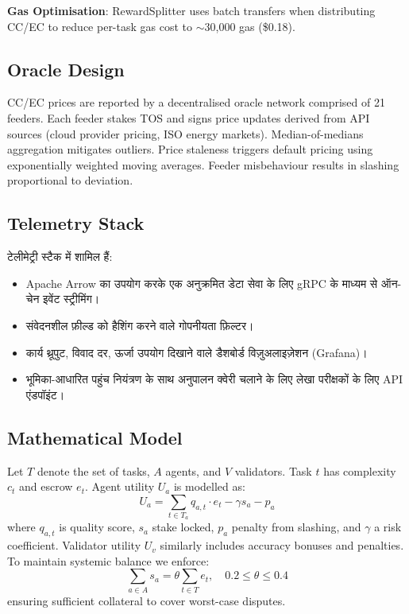 \documentclass[11pt]{article}
\begin{document}
\textbf{Gas Optimisation}: RewardSplitter uses batch transfers when distributing CC/EC to reduce per-task gas cost to $\sim$30,000 gas (\$0.18).

\subsection{Oracle Design}
CC/EC prices are reported by a decentralised oracle network comprised of 21 feeders. Each feeder stakes TOS and signs price updates derived from API sources (cloud provider pricing, ISO energy markets). Median-of-medians aggregation mitigates outliers. Price staleness triggers default pricing using exponentially weighted moving averages. Feeder misbehaviour results in slashing proportional to deviation.

\subsection{Telemetry Stack}
टेलीमेट्री स्टैक में शामिल हैं:
\begin{itemize}[noitemsep]
  \item Apache Arrow का उपयोग करके एक अनुक्रमित डेटा सेवा के लिए gRPC के माध्यम से ऑन-चेन इवेंट स्ट्रीमिंग।
  \item संवेदनशील फ़ील्ड को हैशिंग करने वाले गोपनीयता फ़िल्टर।
  \item कार्य थ्रूपुट, विवाद दर, ऊर्जा उपयोग दिखाने वाले डैशबोर्ड विज़ुअलाइज़ेशन (Grafana)।
  \item भूमिका-आधारित पहुंच नियंत्रण के साथ अनुपालन क्वेरी चलाने के लिए लेखा परीक्षकों के लिए API एंडपॉइंट।
\end{itemize}

\subsection{Mathematical Model}
Let $T$ denote the set of tasks, $A$ agents, and $V$ validators. Task $t$ has complexity $c_t$ and escrow $e_t$. Agent utility $U_a$ is modelled as:
\begin{equation}
U_a = \sum_{t \in T_a} q_{a,t}\cdot e_t - \gamma s_a - p_a\label{eq:agent-utility}
\end{equation}
where $q_{a,t}$ is quality score, $s_a$ stake locked, $p_a$ penalty from slashing, and $\gamma$ a risk coefficient. Validator utility $U_v$ similarly includes accuracy bonuses and penalties. To maintain systemic balance we enforce:
\begin{equation}
\sum_{a \in A} s_a = \theta \sum_{t \in T} e_t,\quad 0.2 \leq \theta \leq 0.4
\end{equation}
ensuring sufficient collateral to cover worst-case disputes.
\end{document}
